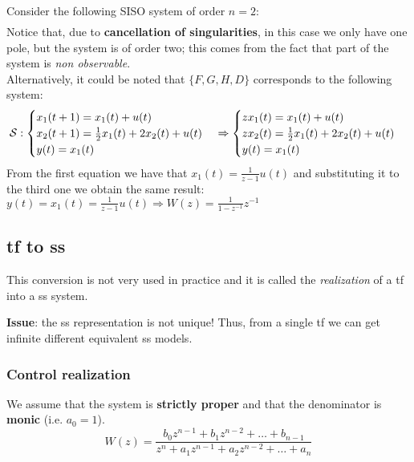 \begin{example}{Consider the following SISO system of order $n=2$:}
\begin{align*}
\end{align*}
Notice that, due to \textbf{cancellation of singularities}, in this case we only have one pole, but the system is of order two; this comes from the fact that part of the system is \emph{non observable}.\\
Alternatively, it could be noted that $\{F, G, H, D\}$ corresponds to the following system:
    \[
    \mathcal{S}: 
        \begin{cases}
            x_1(t+1) = x_1(t) + u(t) \\
            x_2(t+1) = \frac{1}{2} x_1(t) + 2x_2(t) + u(t) \\
            y(t) = x_1(t)
        \end{cases}
    \Rightarrow
        \begin{cases}
            zx_1(t) = x_1(t) + u(t) \\
            zx_2(t) = \frac{1}{2} x_1(t) + 2x_2(t) + u(t) \\
            y(t) = x_1(t)
        \end{cases}    
    \]
From the first equation we have that $x_{1}(t)=\frac{1}{z-1}u(t)$ and substituting it to the third one we obtain the same result: $y(t)=x_{1}(t)=\frac{1}{z-1}u(t) \Rightarrow W(z)=\frac{1}{1-z^{-1}} z^{-1}$     

\end{example}

\subsection{\acrlong{tf} to \acrlong{ss}}
This conversion is not very used in practice and it is called the \emph{realization} of a \acrlong{tf} into a \acrlong{ss} system.

\textbf{Issue}: the \acrlong{ss} representation is not unique! Thus, from a single \acrlong{tf} we can get infinite different equivalent \acrlong{ss} models.

\subsubsection{Control realization}

We assume that the system is \textbf{strictly proper} and that the denominator is \textbf{monic} (i.e. $a_0=1$).
\[ W(z) = \frac{b_0 z^{n-1} + b_1 z^{n-2} + \dots + b_{n-1}}{z^n + a_1 z^{n-1} + a_2 z^{n-2} + \dots + a_n} \]

